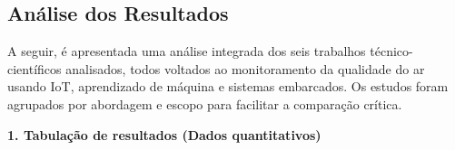 
\subsection{Análise dos Resultados}


A seguir, é apresentada uma análise integrada dos seis trabalhos técnico-científicos analisados, todos voltados ao monitoramento da qualidade do ar usando IoT, aprendizado de máquina e sistemas embarcados. Os estudos foram agrupados por abordagem e escopo para facilitar a comparação crítica.

\par\noindent\textbf{1. Tabulação de resultados (Dados quantitativos)}\par

